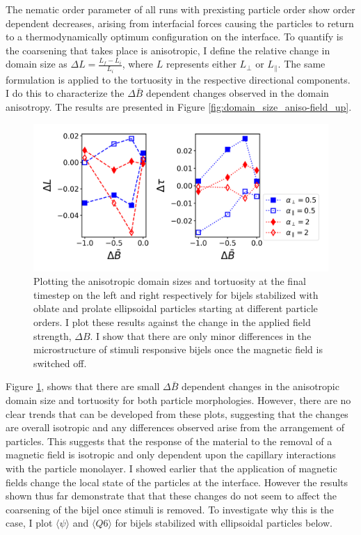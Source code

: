 The nematic order parameter of all runs with prexisting particle order
show order dependent decreases, arising from interfacial forces causing
the particles to return to a thermodynamically optimum configuration on
the interface. To quantify is the coarsening that takes place is
anisotropic, I define the relative change in domain size as
$\Delta L = \frac{L_{f} - L_{i}}{L_{i}}$, where $L$ represents
either $L_{\perp}$ or $L_{\parallel}$. The same formulation is
applied to the tortuosity in the respective directional components. I
do this to characterize the $\Delta \bar{B}$ dependent changes
observed in the domain anisotropy. The results are presented in Figure
\ref{fig:domain_size_aniso-field_up}.

\begin{figure} 
\centering 
\includegraphics[scale = 0.5]{../figures/results/paper2/domain_size_aniso-field_down.png} 
\caption{Plotting the anisotropic domain sizes and tortuosity at the final timestep on the left and right respectively for bijels stabilized with oblate and 
         prolate ellipsoidal particles starting at different particle orders. I plot these results against the change in the applied field strength, 
         $\Delta B$. I show that there are only minor differences in the microstructure of stimuli responsive bijels once the magnetic field is switched off.} 
\label{fig:domain_size_aniso-field_down} 
\end{figure}

Figure \ref{fig:domain_size_aniso-field_down}, shows that there are
small $\Delta \bar{B}$ dependent changes in the anisotropic domain
size and tortuosity for both particle morphologies. However, there are
no clear trends that can be developed from these plots, suggesting that
the changes are overall isotropic and any differences observed arise
from the arrangement of particles. This suggests that the response of
the material to the removal of a magnetic field is isotropic and only
dependent upon the capillary interactions with the particle monolayer.
I showed earlier that the application of magnetic fields change the
local state of the particles at the interface. However the results shown
thus far demonstrate that that these changes do not seem to affect the
coarsening of the bijel once stimuli is removed. To investigate why this
is the case, I plot $\langle \psi \rangle$ and
$\langle Q6 \rangle$ for bijels stabilized with ellipsoidal particles
below.

